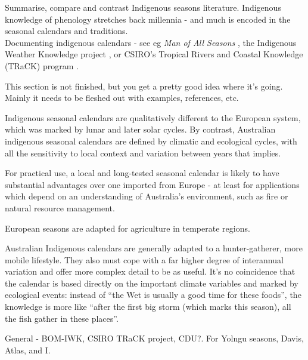 Summarise, compare and contrast Indigenous seasons literature.
Indigenous knowledge of phenology stretches back millennia - and much is
encoded in the seasonal calendars and traditions.\\


Documenting indigenous calendars - see eg \textit{Man of All Seasons} \citep{davis1989},
the Indigenous Weather Knowledge project \citet{BOM-iwk},
or CSIRO's Tropical Rivers and Coastal Knowledge (TRaCK) program \citep{CSIROcals,oconnor2010}.


This section is not finished, but you get a pretty good idea where it's
going.  Mainly it needs to be fleshed out with examples, references, etc.

Indigenous seasonal calendars are qualitatively different to the European
system, which was marked by lunar and later solar cycles.  By contrast,
Australian indigenous seasonal calendars are defined by climatic and ecological
cycles, with all the sensitivity to local context and variation between years
that implies.

For practical use, a local and long-tested seasonal calendar is likely to have
substantial advantages over one imported from Europe - at least for
applications which depend on an understanding of Australia's environment, such
as fire or natural resource management.

European seasons are adapted for agriculture in temperate regions.

Australian Indigenous calendars are generally adapted to a hunter-gatherer,
more mobile lifestyle.  They also must cope with a far higher degree of
interannual variation and offer more complex detail to be as useful.  It's no
coincidence that the calendar is based directly on the important climate
variables and marked by ecological events:  instead of ``the Wet is usually a
good time for these foods'', the knowledge is more like ``after the first big
storm (which marks this season), all the fish gather in these places''.




General - BOM-IWK, CSIRO TRaCK project, CDU?.  For Yolngu seasons, Davis, Atlas, and I.

